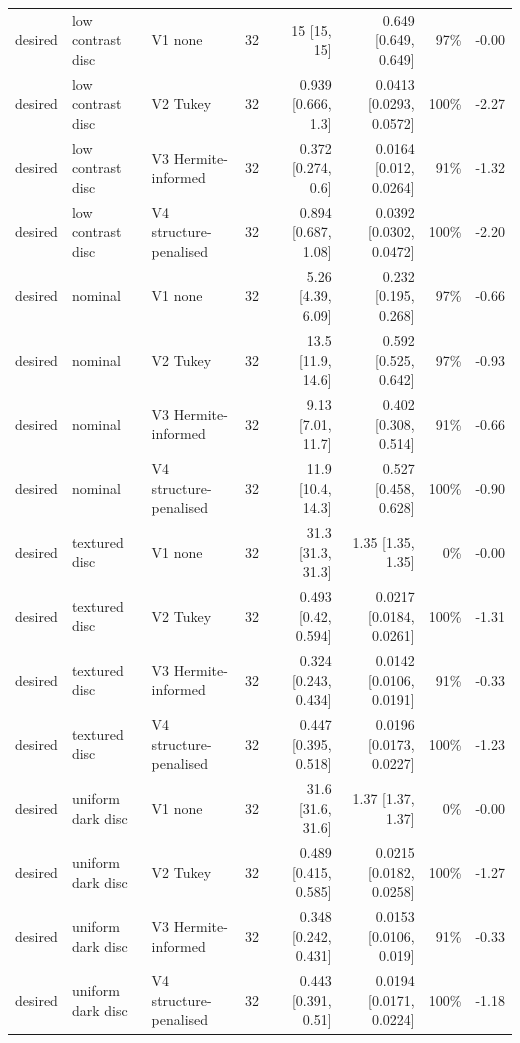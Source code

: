 \begin{tabular}{@{}lllrrrrr@{}}
desired & low contrast disc & V1 none & 32 & 15 [15, 15] & 0.649 [0.649, 0.649] & 97\% & -0.00 \\
desired & low contrast disc & V2 Tukey & 32 & 0.939 [0.666, 1.3] & 0.0413 [0.0293, 0.0572] & 100\% & -2.27 \\
desired & low contrast disc & V3 Hermite-informed & 32 & 0.372 [0.274, 0.6] & 0.0164 [0.012, 0.0264] & 91\% & -1.32 \\
desired & low contrast disc & V4 structure-penalised & 32 & 0.894 [0.687, 1.08] & 0.0392 [0.0302, 0.0472] & 100\% & -2.20 \\
desired & nominal & V1 none & 32 & 5.26 [4.39, 6.09] & 0.232 [0.195, 0.268] & 97\% & -0.66 \\
desired & nominal & V2 Tukey & 32 & 13.5 [11.9, 14.6] & 0.592 [0.525, 0.642] & 97\% & -0.93 \\
desired & nominal & V3 Hermite-informed & 32 & 9.13 [7.01, 11.7] & 0.402 [0.308, 0.514] & 91\% & -0.66 \\
desired & nominal & V4 structure-penalised & 32 & 11.9 [10.4, 14.3] & 0.527 [0.458, 0.628] & 100\% & -0.90 \\
desired & textured disc & V1 none & 32 & 31.3 [31.3, 31.3] & 1.35 [1.35, 1.35] & 0\% & -0.00 \\
desired & textured disc & V2 Tukey & 32 & 0.493 [0.42, 0.594] & 0.0217 [0.0184, 0.0261] & 100\% & -1.31 \\
desired & textured disc & V3 Hermite-informed & 32 & 0.324 [0.243, 0.434] & 0.0142 [0.0106, 0.0191] & 91\% & -0.33 \\
desired & textured disc & V4 structure-penalised & 32 & 0.447 [0.395, 0.518] & 0.0196 [0.0173, 0.0227] & 100\% & -1.23 \\
desired & uniform dark disc & V1 none & 32 & 31.6 [31.6, 31.6] & 1.37 [1.37, 1.37] & 0\% & -0.00 \\
desired & uniform dark disc & V2 Tukey & 32 & 0.489 [0.415, 0.585] & 0.0215 [0.0182, 0.0258] & 100\% & -1.27 \\
desired & uniform dark disc & V3 Hermite-informed & 32 & 0.348 [0.242, 0.431] & 0.0153 [0.0106, 0.019] & 91\% & -0.33 \\
desired & uniform dark disc & V4 structure-penalised & 32 & 0.443 [0.391, 0.51] & 0.0194 [0.0171, 0.0224] & 100\% & -1.18 \\
\bottomrule
\end{tabular}
